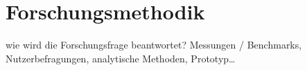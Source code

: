 \chapter{Forschungsmethodik}\label{ch:outlook}

wie wird die Forschungsfrage beantwortet? Messungen / Benchmarks, Nutzerbefragungen, analytische Methoden, Prototyp\dots
